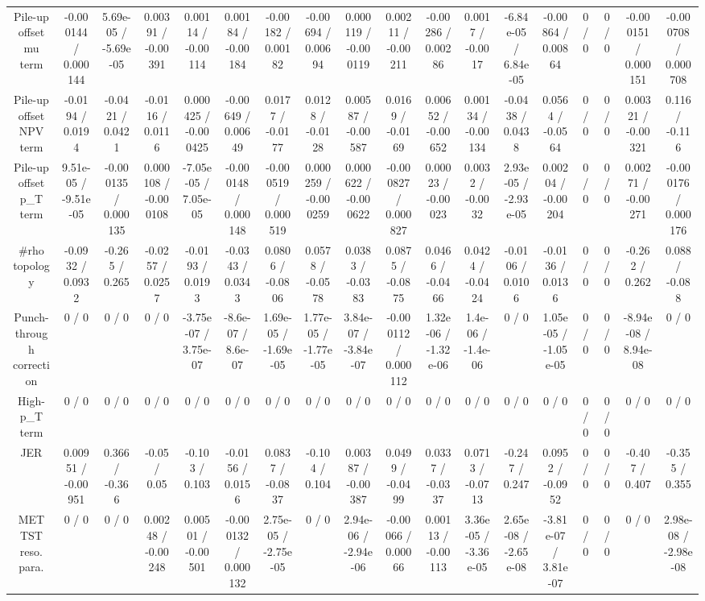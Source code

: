 \documentclass[10pt]{article}
\begin{document}
\begin{table}[htbp]
\begin{center}
\begin{tabular}{|c|c|c|c|c|c|c|c|c|c|c|c|c|c|c|c|c|c|}
  Pile-up offset mu term & -0.000144 / 0.000144 & 5.69e-05 / -5.69e-05 & 0.00391 / -0.00391 & 0.00114 / -0.00114 & 0.00184 / -0.00184 & -0.00182 / 0.00182 & -0.00694 / 0.00694 & 0.000119 / -0.000119 & 0.00211 / -0.00211 & -0.00286 / 0.00286 & 0.0017 / -0.0017 & -6.84e-05 / 6.84e-05 & -0.00864 / 0.00864 & 0 / 0 & 0 / 0 & -0.000151 / 0.000151 & -0.000708 / 0.000708 \\ 
  Pile-up offset NPV term & -0.0194 / 0.0194 & -0.0421 / 0.0421 & -0.0116 / 0.0116 & 0.000425 / -0.000425 & -0.00649 / 0.00649 & 0.0177 / -0.0177 & 0.0128 / -0.0128 & 0.00587 / -0.00587 & 0.0169 / -0.0169 & 0.00652 / -0.00652 & 0.00134 / -0.00134 & -0.0438 / 0.0438 & 0.0564 / -0.0564 & 0 / 0 & 0 / 0 & 0.00321 / -0.00321 & 0.116 / -0.116 \\ 
  Pile-up offset p_{T} term & 9.51e-05 / -9.51e-05 & -0.000135 / 0.000135 & 0.000108 / -0.000108 & -7.05e-05 / 7.05e-05 & -0.000148 / 0.000148 & -0.000519 / 0.000519 & 0.000259 / -0.000259 & 0.000622 / -0.000622 & -0.000827 / 0.000827 & 0.00023 / -0.00023 & 0.0032 / -0.0032 & 2.93e-05 / -2.93e-05 & 0.00204 / -0.00204 & 0 / 0 & 0 / 0 & 0.00271 / -0.00271 & -0.000176 / 0.000176 \\ 
  #rho topology & -0.0932 / 0.0932 & -0.265 / 0.265 & -0.0257 / 0.0257 & -0.0193 / 0.0193 & -0.0343 / 0.0343 & 0.0806 / -0.0806 & 0.0578 / -0.0578 & 0.0383 / -0.0383 & 0.0875 / -0.0875 & 0.0466 / -0.0466 & 0.0424 / -0.0424 & -0.0106 / 0.0106 & -0.0136 / 0.0136 & 0 / 0 & 0 / 0 & -0.262 / 0.262 & 0.088 / -0.088 \\ 
  Punch-through correction & 0 / 0 & 0 / 0 & 0 / 0 & -3.75e-07 / 3.75e-07 & -8.6e-07 / 8.6e-07 & 1.69e-05 / -1.69e-05 & 1.77e-05 / -1.77e-05 & 3.84e-07 / -3.84e-07 & -0.000112 / 0.000112 & 1.32e-06 / -1.32e-06 & 1.4e-06 / -1.4e-06 & 0 / 0 & 1.05e-05 / -1.05e-05 & 0 / 0 & 0 / 0 & -8.94e-08 / 8.94e-08 & 0 / 0 \\ 
  High-p_{T} term & 0 / 0 & 0 / 0 & 0 / 0 & 0 / 0 & 0 / 0 & 0 / 0 & 0 / 0 & 0 / 0 & 0 / 0 & 0 / 0 & 0 / 0 & 0 / 0 & 0 / 0 & 0 / 0 & 0 / 0 & 0 / 0 & 0 / 0 \\ 
  JER & 0.00951 / -0.00951 & 0.366 / -0.366 & -0.05 / 0.05 & -0.103 / 0.103 & -0.0156 / 0.0156 & 0.0837 / -0.0837 & -0.104 / 0.104 & 0.00387 / -0.00387 & 0.0499 / -0.0499 & 0.0337 / -0.0337 & 0.0713 / -0.0713 & -0.247 / 0.247 & 0.0952 / -0.0952 & 0 / 0 & 0 / 0 & -0.407 / 0.407 & -0.355 / 0.355 \\ 
  MET TST reso. para. & 0 / 0 & 0 / 0 & 0.00248 / -0.00248 & 0.00501 / -0.00501 & -0.000132 / 0.000132 & 2.75e-05 / -2.75e-05 & 0 / 0 & 2.94e-06 / -2.94e-06 & -0.00066 / 0.00066 & 0.00113 / -0.00113 & 3.36e-05 / -3.36e-05 & 2.65e-08 / -2.65e-08 & -3.81e-07 / 3.81e-07 & 0 / 0 & 0 / 0 & 0 / 0 & 2.98e-08 / -2.98e-08 \\ 

\end{tabular}
\end{center}
\end{table}
\end{document}

